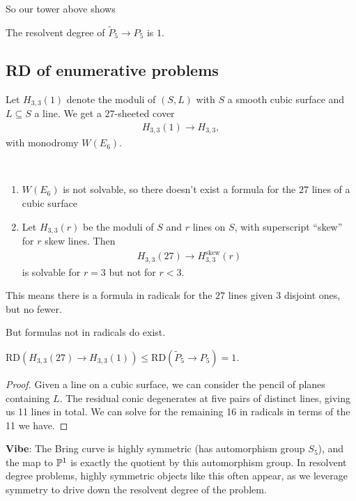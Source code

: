 \documentclass[11pt]{amsart}
\let\til\widetilde
\providecommand{\RD}{\mathrm{RD}}
\begin{document}
So our tower above shows

\begin{theorem} The resolvent degree of $\til{P}_5 \to P_5$ is $1$.
\end{theorem}

\subsection{RD of enumerative problems}

Let $H_{3,3}(1)$ denote the moduli of $(S,L)$ with $S$ a smooth cubic surface and $L \subseteq S$ a line. We get a $27$-sheeted cover
\begin{align*}
    H_{3,3}(1) \to H_{3,3},
\end{align*}
with monodromy $W(E_6)$.

\begin{remark} \,
\begin{enumerate}
    \item $W(E_6)$ is not solvable, so there doesn't exist a formula for the $27$ lines of a cubic surface
    \item Let $H_{3,3}(r)$ be the moduli of $S$ and $r$ lines on $S$, with superscript ``skew'' for $r$ skew lines. Then
    \begin{align*}
        H_{3,3}(27) \to H_{3,3}^\text{skew}(r)
    \end{align*}
    is solvable for $r=3$ but not for $r<3$.
\end{enumerate}
This means there is a formula in radicals for the $27$ lines given $3$ disjoint ones, but no fewer.
\end{remark}

But formulas not in radicals do exist.

\begin{theorem} $\RD(H_{3,3}(27) \to H_{3,3}(1)) \le \RD(\til{P}_5 \to P_5) = 1$.
\end{theorem}
\begin{proof} Given a line on a cubic surface, we can consider the pencil of planes containing $L$. The residual conic degenerates at five pairs of distinct lines, giving us 11 lines in total. We can solve for the remaining 16 in radicals in terms of the 11 we have.
\end{proof}



\textbf{Vibe}: The Bring curve is highly symmetric (has automorphism group $S_5$), and the map to $\P^1$ is exactly the quotient by this automorphism group. In resolvent degree problems, highly symmetric objects like this often appear, as we leverage symmetry to drive down the resolvent degree of the problem.
\end{document}
